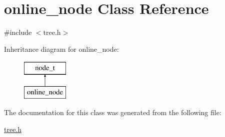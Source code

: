 \hypertarget{classonline__node}{\section{online\+\_\+node Class Reference}
\label{classonline__node}
}


{\ttfamily \#include $<$tree.\+h$>$}

Inheritance diagram for online\+\_\+node\+:\begin{figure}[H]
\begin{center}
\leavevmode
\includegraphics[height=2.000000cm]{classonline__node}
\end{center}
\end{figure}


The documentation for this class was generated from the following file\+:\begin{DoxyCompactItemize}
\item 
\hyperlink{tree_8h}{tree.\+h}\end{DoxyCompactItemize}
